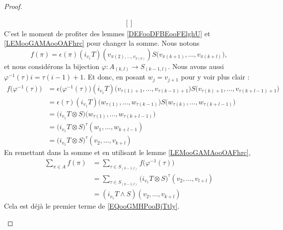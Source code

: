 \begin{proof}
\begin{subproof}
\begin{equation}
\begin{aligned}[]
			\end{aligned}
		\end{equation}
		C'est le moment de profiter des lemmes \ref{DEFooDFBEooFElghU} et \ref{LEMooGAMAooOAFhrc} pour changer la somme. Nous notons
		\begin{equation}
			f(\pi)=\epsilon(\pi)(i_{v_1}T)(v_{\pi(2),\ldots,v_{\pi(k)}})S\big( v_{\pi(k+1)},\ldots,v_{\pi(k+l)} \big),
		\end{equation}
		et nous considérons la bijection \(\varphi \colon A_{(k,l)}\to S_{(k-1,l)}  \). Nous avons aussi \( \varphi^{-1}(\tau)i=\tau(i-1)+1\). Et donc, en posant \( w_j=v_{j+1}\) pour y voir plus clair :
		\begin{subequations}
			\begin{align}
				f\big( \varphi^{-1}(\tau) \big) & =\epsilon\big( \varphi^{-1}(\tau) \big)(i_{v_1}T)\big( v_{\tau(1)+1},\ldots,v_{\tau(k-1)+1} \big)S\big( v_{\tau(k)+1},\ldots,v_{\tau(k+l-1)+1} \big) \\
				                                & =\epsilon(\tau)(i_{v_1}T)\big( w_{\tau(1)},\ldots,w_{\tau(k-1)} \big)S\big( w_{\tau(k)},\ldots,w_{\tau(k+l-1)} \big)                                 \\
				                                & = \big( i_{v_1}T\otimes S \big)\big( w_{\tau(1)},\ldots,w_{\tau(k+l-1)} \big)                                                                        \\
				                                & = \big( i_{v_1}T\otimes S \big)^{\tau}(w_1,\ldots,w_{k+l-1})                                                                                         \\
				                                & = \big( i_{v_1}T\otimes S \big)^{\tau}(v_2,\ldots,v_{k+l})
			\end{align}
		\end{subequations}
		En remettant dans la somme et en utilisant le lemme \ref{LEMooGAMAooOAFhrc},
		\begin{subequations}		\label{SUBEQSooSDMCooHmPCZr}
			\begin{align}
				\sum_{\pi\in A}f(\pi) & =\sum_{\tau\in S_{(k-1,l)}}f\big( \varphi^{-1}(\tau) \big)                           \\
				                      & =\sum_{\tau \in S_{(k-1,l)}}\big( i_{v_1}T\otimes S \big)^{\tau}(v_2,\ldots,v_{l+l}) \\
				                      & =(i_{v_1}T\wedge S)(v_2,\ldots,v_{k+l})
			\end{align}
		\end{subequations}
		Cela est déjà le premier terme de \eqref{EQooGMHPooBjTtly}.


\end{subproof}
\end{proof}
